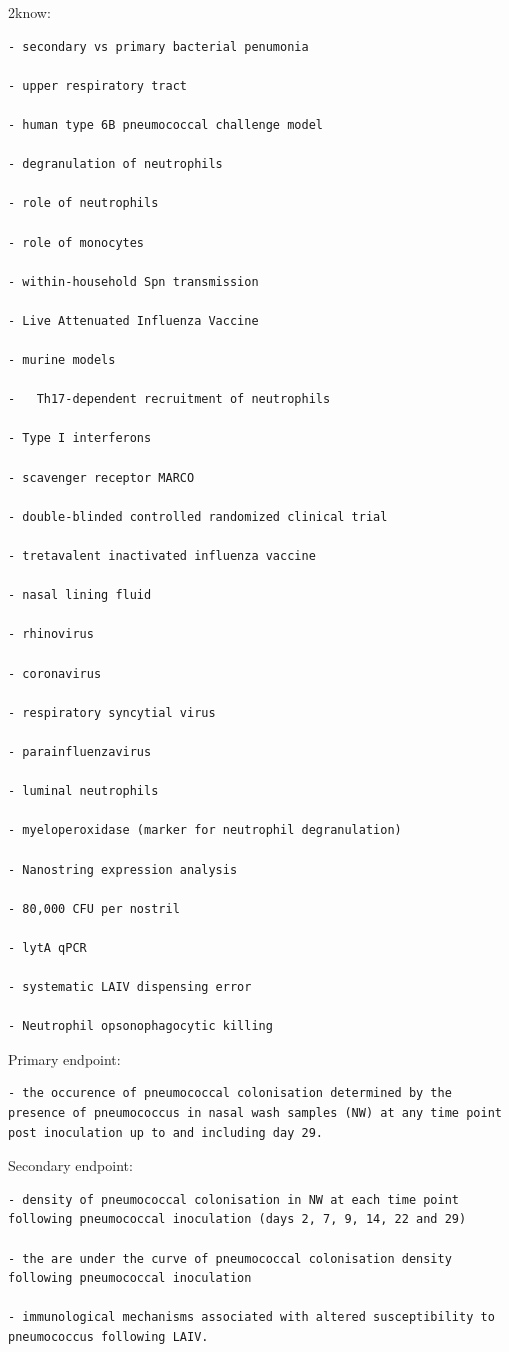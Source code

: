 \documentclass[
]{book}
\begin{document}
2know:

\begin{verbatim}
- secondary vs primary bacterial penumonia

- upper respiratory tract

- human type 6B pneumococcal challenge model

- degranulation of neutrophils

- role of neutrophils

- role of monocytes

- within-household Spn transmission

- Live Attenuated Influenza Vaccine

- murine models

-   Th17-dependent recruitment of neutrophils

- Type I interferons

- scavenger receptor MARCO

- double-blinded controlled randomized clinical trial

- tretavalent inactivated influenza vaccine

- nasal lining fluid

- rhinovirus

- coronavirus

- respiratory syncytial virus

- parainfluenzavirus

- luminal neutrophils

- myeloperoxidase (marker for neutrophil degranulation)

- Nanostring expression analysis

- 80,000 CFU per nostril

- lytA qPCR

- systematic LAIV dispensing error

- Neutrophil opsonophagocytic killing
\end{verbatim}

Primary endpoint:

\begin{verbatim}
- the occurence of pneumococcal colonisation determined by the presence of pneumococcus in nasal wash samples (NW) at any time point post inoculation up to and including day 29.
\end{verbatim}

Secondary endpoint:

\begin{verbatim}
- density of pneumococcal colonisation in NW at each time point following pneumococcal inoculation (days 2, 7, 9, 14, 22 and 29)

- the are under the curve of pneumococcal colonisation density following pneumococcal inoculation

- immunological mechanisms associated with altered susceptibility to pneumococcus following LAIV.
\end{verbatim}
\end{document}
